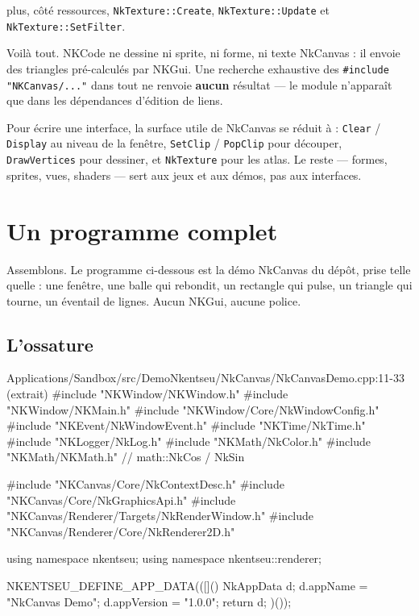 \noindent plus, côté ressources, \texttt{NkTexture::Create},
\texttt{NkTexture::Update} et \texttt{NkTexture::SetFilter}.

Voilà tout. NKCode ne dessine ni sprite, ni forme, ni texte NkCanvas : il envoie
des triangles pré-calculés par NKGui. Une recherche exhaustive des
\texttt{\#include "NKCanvas/..."} dans tout  ne
renvoie \textbf{aucun} résultat — le module n'apparaît que dans les dépendances
d'édition de liens.

\begin{nkretenir}
Pour écrire une interface, la surface utile de NkCanvas se réduit à :
\texttt{Clear} / \texttt{Display} au niveau de la fenêtre,
\texttt{SetClip} / \texttt{PopClip} pour découper, \texttt{DrawVertices} pour
dessiner, et \texttt{NkTexture} pour les atlas. Le reste — formes, sprites,
vues, shaders — sert aux jeux et aux démos, pas aux interfaces.
\end{nkretenir}

\section{Un programme complet}

Assemblons. Le programme ci-dessous est la démo NkCanvas du dépôt, prise telle
quelle : une fenêtre, une balle qui rebondit, un rectangle qui pulse, un triangle
qui tourne, un éventail de lignes. Aucun NKGui, aucune police.

\subsection{L'ossature}

\begin{nkcode}{Applications/Sandbox/src/DemoNkentseu/NkCanvas/NkCanvasDemo.cpp:11-33 (extrait)}
#include "NKWindow/NKWindow.h"
#include "NKWindow/NKMain.h"
#include "NKWindow/Core/NkWindowConfig.h"
#include "NKEvent/NkWindowEvent.h"
#include "NKTime/NkTime.h"
#include "NKLogger/NkLog.h"
#include "NKMath/NkColor.h"
#include "NKMath/NKMath.h" // math::NkCos / NkSin

#include "NKCanvas/Core/NkContextDesc.h"
#include "NKCanvas/Core/NkGraphicsApi.h"
#include "NKCanvas/Renderer/Targets/NkRenderWindow.h"
#include "NKCanvas/Renderer/Core/NkRenderer2D.h"

using namespace nkentseu;
using namespace nkentseu::renderer;

NKENTSEU_DEFINE_APP_DATA(([]() {
    NkAppData d{};
    d.appName = "NkCanvas Demo";
    d.appVersion = "1.0.0";
    return d;
})());
\end{nkcode}

